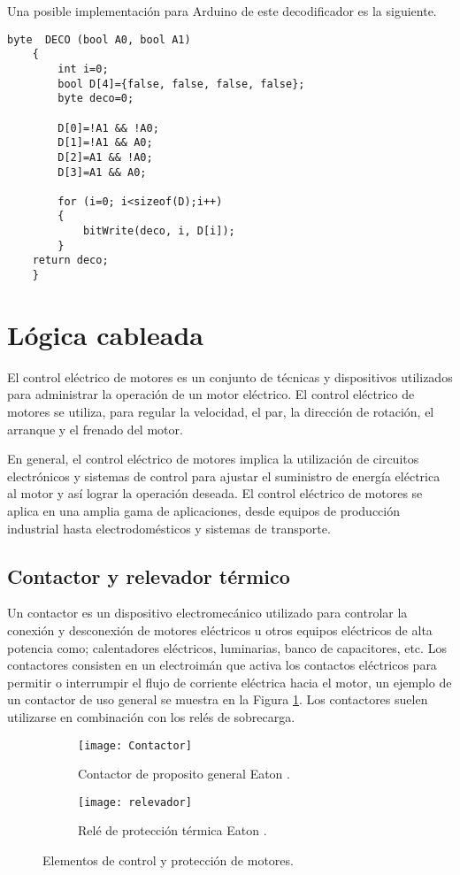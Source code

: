 Una posible implementación para Arduino de este decodificador es la siguiente.

\begin{lstlisting}[language=Arduino,numbers=none, showstringspaces=false]
	byte  DECO (bool A0, bool A1)
	{
		int i=0;
		bool D[4]={false, false, false, false};
		byte deco=0;
	
		D[0]=!A1 && !A0;
		D[1]=!A1 && A0;
		D[2]=A1 && !A0;
		D[3]=A1 && A0;
	
		for (i=0; i<sizeof(D);i++)
		{
			bitWrite(deco, i, D[i]);
		}
	return deco;
	}
\end{lstlisting}
  
\section{Lógica cableada}

El control eléctrico de motores es un conjunto de técnicas y dispositivos utilizados para administrar la operación de un motor eléctrico. El control eléctrico de motores se utiliza, para regular la velocidad, el par, la dirección de rotación, el arranque y el frenado del motor.

En general, el control eléctrico de motores implica la utilización de circuitos electrónicos y sistemas de control para ajustar el suministro de energía eléctrica al motor y así lograr la operación deseada. El control eléctrico de motores se aplica en una amplia gama de aplicaciones, desde equipos de producción industrial hasta electrodomésticos y sistemas de transporte.

\subsection{Contactor y relevador térmico}

Un contactor es un dispositivo electromecánico utilizado para controlar la conexión y desconexión de motores eléctricos u otros equipos eléctricos de alta potencia como; calentadores eléctricos, luminarias, banco de capacitores, etc. Los contactores consisten en un electroimán que activa los contactos eléctricos para permitir o interrumpir el flujo de corriente eléctrica hacia el motor, un ejemplo de un contactor de uso general se muestra en la Figura \ref{fig:contactor}. Los contactores suelen utilizarse en combinación con los relés de sobrecarga.


\begin{figure}
	\centering
	\begin{subfigure}[b]{0.4\textwidth}
		\centering
		\texttt{[image: Contactor]}
		\caption{Contactor de proposito general Eaton \cite{Eaton1}.}
		\label{fig:contactor}
	\end{subfigure}
\hfill
	\begin{subfigure}[b]{0.4\textwidth}
		\centering
		\texttt{[image: relevador]}
		\caption{Relé de protección térmica Eaton \cite{Eaton2}.}
		\label{fig:rele}
	\end{subfigure}
\caption{Elementos de control y protección de motores.}
\end{figure}


